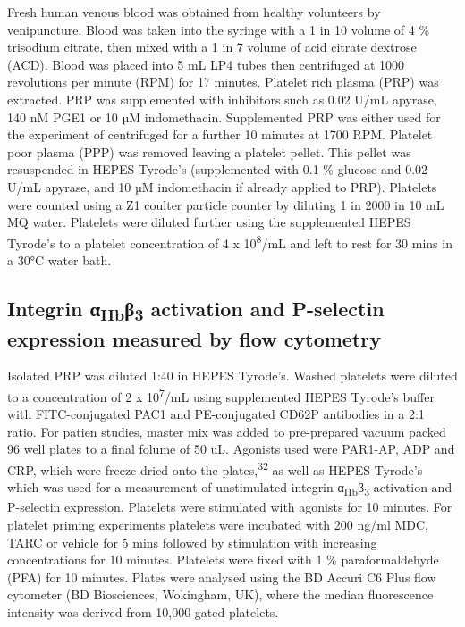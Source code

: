 \documentclass[11pt,twoside]{bristolthesis}
\begin{document}
Fresh human venous blood was obtained from healthy volunteers by venipuncture. Blood was taken into the syringe with a 1 in 10 volume of 4 \% trisodium citrate, then mixed with a 1 in 7 volume of acid citrate dextrose (ACD). Blood was placed into 5 mL LP4 tubes then centrifuged at 1000 revolutions per minute (RPM) for 17 minutes. Platelet rich plasma (PRP) was extracted. PRP was supplemented with inhibitors such as 0.02 U/mL apyrase, 140 nM PGE1 or 10 µM indomethacin. Supplemented PRP was either used for the experiment of centrifuged for a further 10 minutes at 1700 RPM. Platelet poor plasma (PPP) was removed leaving a platelet pellet. This pellet was resuspended in HEPES Tyrode's (supplemented with 0.1 \% glucose and 0.02 U/mL apyrase, and 10 µM indomethacin if already applied to PRP). Platelets were counted using a Z1 coulter particle counter by diluting 1 in 2000 in 10 mL MQ water. Platelets were diluted further using the supplemented HEPES Tyrode's to a platelet concentration of 4 x 10\textsuperscript{8}/mL and left to rest for 30 mins in a 30°C water bath.

\hypertarget{integrin-ux3b1iibux3b23-activation-and-p-selectin-expression-measured-by-flow-cytometry}{%
\subsection{\texorpdfstring{Integrin α\textsubscript{IIb}β\textsubscript{3} activation and P-selectin expression measured by flow cytometry}{Integrin αIIbβ3 activation and P-selectin expression measured by flow cytometry}}\label{integrin-ux3b1iibux3b23-activation-and-p-selectin-expression-measured-by-flow-cytometry}}

Isolated PRP was diluted 1:40 in HEPES Tyrode's. Washed platelets were diluted to a concentration of 2 x 10\textsuperscript{7}/mL using supplemented HEPES Tyrode's buffer with FITC-conjugated PAC1 and PE-conjugated CD62P antibodies in a 2:1 ratio. For patien studies, master mix was added to pre-prepared vacuum packed 96 well plates to a final folume of 50 uL. Agonists used were PAR1-AP, ADP and CRP, which were freeze-dried onto the plates,\textsuperscript{32} as well as HEPES Tyrode's which was used for a measurement of unstimulated integrin α\textsubscript{IIb}β\textsubscript{3} activation and P-selectin expression. Platelets were stimulated with agonists for 10 minutes. For platelet priming experiments platelets were incubated with 200 ng/ml MDC, TARC or vehicle for 5 mins followed by stimulation with increasing concentrations for 10 minutes. Platelets were fixed with 1 \% paraformaldehyde (PFA) for 10 minutes. Plates were analysed using the BD Accuri C6 Plus flow cytometer (BD Biosciences, Wokingham, UK), where the median fluorescence intensity was derived from 10,000 gated platelets.
\end{document}
